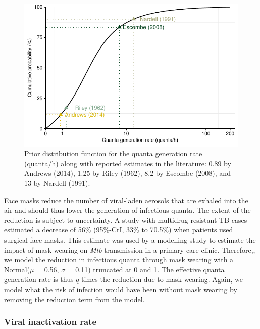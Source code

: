 \documentclass[fleqn,11pt]{wlscirep_supp}
\begin{document}
\begin{figure}[!htpb]
    \centering
    \includegraphics{illustrations/prior-q.pdf}
    \caption{Prior distribution function for the quanta generation rate (quanta/h) along with reported estimates in the literature: 0.89 by Andrews (2014)\cite{Andrews2014JID}, 1.25 by Riley (1962)\cite{Riley1962ARRD}, 8.2 by Escombe (2008)\cite{Escombe2008PLoSMed}, and 13 by Nardell (1991)\cite{Nardell1991ARRD}.}
    \label{fig:quanta-distribution}
\end{figure}


Face masks reduce the number of viral-laden aerosols that are exhaled into the air\cite{Milton2013PLoSPathogens,Leung2020NatMed} and should thus lower the generation of infectious quanta. The extent of the reduction is subject to uncertainty. A study with multidrug-resistant TB cases estimated a decrease of 56\% (95\%-CrI, 33\% to 70.5\%) when patients used surgical face masks\cite{Dharmadhikari2012AJRCCM}. This estimate was used by a modelling study to estimate the impact of mask wearing on \emph{Mtb} transmission in a primary care clinic. Therefore,, we model the reduction in infectious quanta through mask wearing with a Normal($\mu$ = 0.56, $\sigma$ = 0.11) truncated at 0 and 1. The effective quanta generation rate is thus $q$ times the reduction due to mask wearing. Again, we model what the risk of infection would have been without mask wearing by removing the reduction term from the model. 

\subsubsection{Viral inactivation rate}
\end{document}
